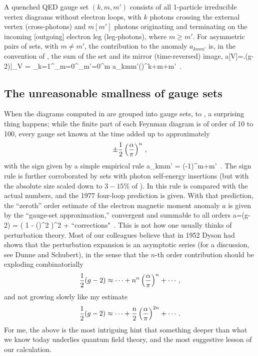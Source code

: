 A quenched QED gauge set $(k,m,m')$ consists of all 1-particle irreducible vertex
diagrams without electron loops, with $k$ photons crossing the external
vertex (cross-photons) and $m [m']$ photons originating and terminating
on the incoming [outgoing] electron leg (leg-photons), where $m\geq m'$.
For asymmetric pairs of sets, with $m\neq m'$, the contribution to the
anomaly $a_{kmm'}$ is, in the convention of , the sum of
the set and its mirror (time-reversed) image,
\beq
a[V]=\left.(g-2)\right|_V
       =  \sum_{k=1}^\infty\sum_{m=0}^\infty\sum_{m'=0}^m
          a_{kmm'}\left(\frac{\alpha}{\pi}\right)^{k+m+m'}
\,.

\subsection{The unreasonable smallness of gauge sets}
\label{sect:gaugeSetsSmall}

When the diagrams computed in  are grouped into
gauge sets,  to ,
a surprising thing happens; while the
finite part of each Feynman diagram is of order of 10 to 100, every
 gauge set known at the time added up to approximately
$$
		   \pm {1 \over 2} \left(\frac{\alpha}{\pi}\right)^n
\,,
$$
with the sign given by a simple empirical rule
\beq
a_{kmm'} = (-1)^{m+m'}
\,.
The sign rule is further corroborated by sets with photon
self-energy insertions (but with the absolute size scaled down to
$3-15\%$ of ).
In  this rule is compared with the actual numbers,
and the 1977 four-loop prediction is given.
With that prediction, the ``zeroth'' order estimate of the electron
magnetic moment anomaly $a$ is given by the ``gauge-set
approximation,'' convergent and summable to all orders
\beq
a=(g-2) =   \frac{\alpha}{\pi}
           {\left( 1 - \left(\frac{\alpha}{\pi}\right)^2
			\right)^2
		      } + \mbox{``corrections"}
\,.
This is not how one usually thinks of perturbation theory. Most of our
colleagues believe that in 1952 Dyson had  shown that the
perturbation expansion is an asymptotic series (for a discussion, see
Dunne and Schubert), in the sense that the $n$-th order
contribution should be exploding combinatorially
$$
{1 \over 2} (g-2) \approx
\cdots + n^n \left(\frac{\alpha}{\pi}\right)^n + \cdots
\,,
$$
and not growing slowly like my estimate
\[
{1 \over 2} (g-2) \approx
\cdots + \frac{n}{2}\left(\frac{\alpha}{\pi}\right)^{2n} + \cdots
\,.
\]
For me, the above is the most intriguing hint that something deeper than
what we know today underlies quantum field theory, and the most suggestive
lesson of our calculation.

